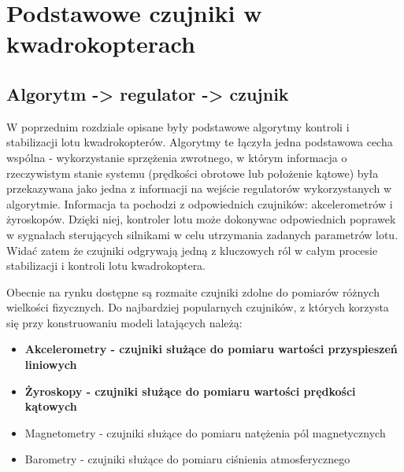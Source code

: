 
\chapter{Podstawowe czujniki w kwadrokopterach} %

\label{Chapter4} %


\section{Algorytm -> regulator -> czujnik}

W poprzednim rozdziale opisane były podstawowe algorytmy kontroli i stabilizacji lotu kwadrokopterów. Algorytmy te łączyła jedna podstawowa cecha wspólna - wykorzystanie sprzężenia zwrotnego, w którym informacja o rzeczywistym stanie systemu (prędkości obrotowe lub położenie kątowe) była przekazywana jako jedna z informacji na wejście regulatorów wykorzystanych w algorytmie. Informacja ta pochodzi z odpowiednich czujników: akcelerometrów i żyroskopów. Dzięki niej, kontroler lotu może dokonywac odpowiednich poprawek w sygnałach sterujących silnikami w celu utrzymania zadanych parametrów lotu. Widać zatem że czujniki odgrywają jedną z kluczowych ról w całym procesie stabilizacji i kontroli lotu kwadrokoptera. 

Obecnie na rynku dostępne są rozmaite czujniki zdolne do pomiarów różnych wielkości fizycznych. Do najbardziej popularnych czujników, z których korzysta się przy konstruowaniu modeli latających należą:

\begin{itemize}
	\item \textbf{Akcelerometry - czujniki służące do pomiaru wartości przyspieszeń liniowych}
	\item \textbf{Żyroskopy - czujniki służące do pomiaru wartości prędkości kątowych}
	\item Magnetometry - czujniki służące do pomiaru natężenia pól magnetycznych
	\item Barometry - czujniki służące do pomiaru ciśnienia atmosferycznego
\end{itemize}

